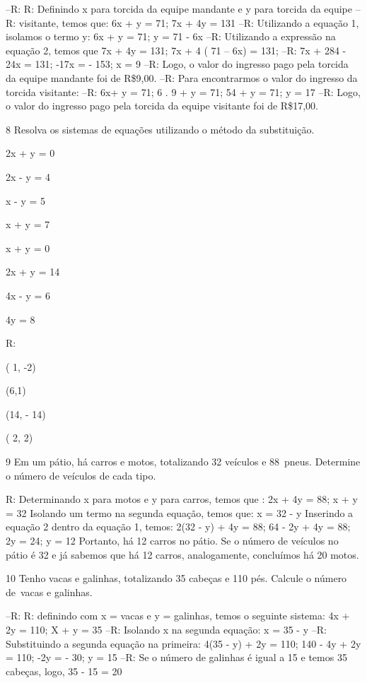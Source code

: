{--R: R: Definindo x para torcida da equipe mandante e y para torcida da equipe
--R: visitante, temos que: 6x + y = 71; 7x + 4y = 131
--R: Utilizando a equação 1, isolamos o termo y: 6x + y = 71; y = 71 - 6x
--R: Utilizando a expressão na equação 2, temos que 7x + 4y = 131; 7x + 4 ( 71 -- 6x) = 131; 
--R: 7x + 284 - 24x = 131; -17x = - 153; x = 9
--R: Logo, o valor do ingresso pago pela torcida da equipe mandante foi de R\$9,00.
--R: Para encontrarmos o valor do ingresso da torcida visitante:
--R: 6x+ y = 71; 6 . 9 + y = 71; 54 + y = 71; y = 17
--R: Logo, o valor do ingresso pago pela torcida da equipe visitante foi de R\$17,00.

\num{8} Resolva os sistemas de equações utilizando o método da substituição.
\item 2x + y = 0

2x - y = 4
\item x - y = 5

x + y = 7
\item x + y = 0

2x + y = 14
\item 4x - y = 6

4y = 8

R:
\item ( 1, -2)
\item (6,1)
\item (14, - 14)
\item ( 2, 2)

\num{9} Em um pátio, há carros e motos, totalizando 32 veículos e 88~pneus.
Determine o número de veículos de cada tipo.

R: Determinando x para motos e y para carros, temos que :
2x + 4y = 88; x + y = 32
Isolando um termo na segunda equação, temos que: x = 32 - y
Inserindo a equação 2 dentro da equação 1, temos:
2(32 - y) + 4y = 88; 64 - 2y + 4y = 88; 2y = 24; y = 12
Portanto, há 12 carros no pátio.
Se o número de veículos no pátio é 32 e já sabemos que há 12 carros,
analogamente, concluímos há 20 motos.

\num{10} Tenho vacas e galinhas, totalizando 35 cabeças e 110 pés. Calcule o
número de~vacas e galinhas.

--R: R: definindo com x = vacas e y = galinhas, temos o seguinte sistema: 4x + 2y = 110; X + y = 35
--R: Isolando x na segunda equação: x = 35 - y
--R: Substituindo a segunda equação na primeira: 4(35 - y) + 2y = 110; 140 - 4y + 2y = 110; -2y = - 30; y = 15
--R: Se o número de galinhas é igual a 15 e temos 35 cabeças, logo, 35 - 15 = 20

}
